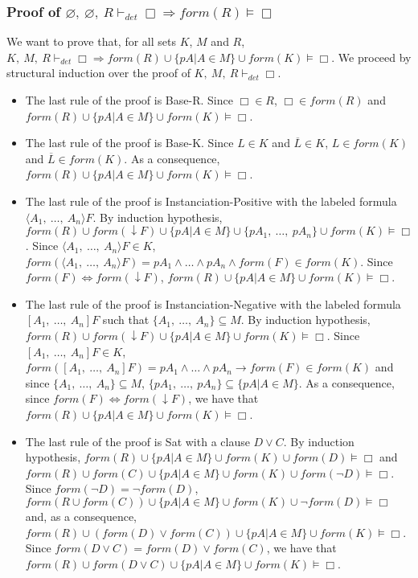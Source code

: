 \documentclass[a4paper,11pt]{article}
\newcommand{\dett}{\vdash_\mathit{det}}
\newcommand{\F}{\mathit{form}}
\begin{document}
\subsubsection*{Proof of $\varnothing,\ \varnothing,\ R\dett\Box\Rightarrow\F(R)\vDash\Box$}
We want to prove that, for all sets $K$, $M$ and $R$, $K,\ M,\ R\dett\Box\Rightarrow
\F(R)\cup\{pA|A\in M\}\cup\F(K)\vDash\Box$. We proceed by structural induction over the proof of
$K,\ M,\ R\dett\Box$.
\begin{itemize}
 \item The last rule of the proof is {\sc Base-R}. Since $\Box\in R$,
$\Box\in\F(R)$ and $\F(R)\cup\{pA|A\in M\}\cup\F(K)\vDash\Box$.
 \item The last rule of the proof is {\sc Base-K}. Since $L\in K$ and $\overline L\in K$,
$L\in \F(K)$ and $\overline L\in\F(K)$. As a consequence, $\F(R)\cup\{pA|A\in M\}\cup\F(K)\vDash\Box$.
 \item The last rule of the proof is {\sc Instanciation-Positive} with the labeled formula
$\langle A_1,\ \dots,\ A_n\rangle F$. By induction hypothesis,
$\F(R)\cup \F(\downarrow F)\cup \{pA|A\in M\}\cup\{pA_1,\ \dots,\ pA_n\}\cup \F(K)\vDash\Box$.
Since $\langle A_1,\ \dots,\ A_n\rangle F\in K$, $\F(\langle A_1,\ \dots,\ A_n\rangle F)=
pA_1\wedge\dots\wedge pA_n\wedge\F(F)\in \F(K)$. Since $\F(F)\Leftrightarrow\F(\downarrow F)$,
$\F(R)\cup\{pA|A\in M\}\cup\F(K)\vDash\Box$.
 \item The last rule of the proof is {\sc Instanciation-Negative} with the labeled formula
$[A_1,\ \dots,\ A_n]F$ such that $\{A_1,\ \dots,\ A_n\}\subseteq M$. By induction hypothesis,
$\F(R)\cup \F(\downarrow F)\cup \{pA|A\in M\}\cup \F(K)\vDash\Box$.
Since $[A_1,\ \dots,\ A_n]F\in K$,
$\F([A_1,\ \dots,\ A_n]F)=pA_1\wedge\dots\wedge pA_n\rightarrow \F(F)\in \F(K)$ and since
$\{A_1,\ \dots,\ A_n\}\subseteq M$, $\{pA_1,\ \dots,\ pA_n\}\subseteq\{pA|A\in M\}$.
As a consequence, since $\F(F)\Leftrightarrow\F(\downarrow F)$,
we have that $\F(R)\cup\{pA|A\in M\}\cup\F(K)\vDash\Box$.
 \item The last rule of the proof is {\sc Sat} with a clause $D\vee C$.
By induction hypothesis,
$\F(R)\cup\{pA|A\in M\}\cup\F(K)\cup\F(D)\vDash\Box$ and
$\F(R)\cup\F(C)\cup\{pA|A\in M\}\cup\F(K)\cup\F(\neg D)\vDash\Box$. Since
$\F(\neg D)=\neg\F(D)$,  $\F(R\cup\F(C))\cup\{pA|A\in M\}\cup\F(K)\cup\neg\F(D)\vDash\Box$ and,
as a consequence, $\F(R)\cup(\F(D)\vee\F(C))\cup\{pA|A\in M\}\cup\F(K)\vDash\Box$.
Since $\F(D\vee C)=\F(D)\vee\F(C)$, we have that
$\F(R)\cup\F(D\vee C)\cup\{pA|A\in M\}\cup\F(K)\vDash\Box$.
\end{itemize}
\end{document}
